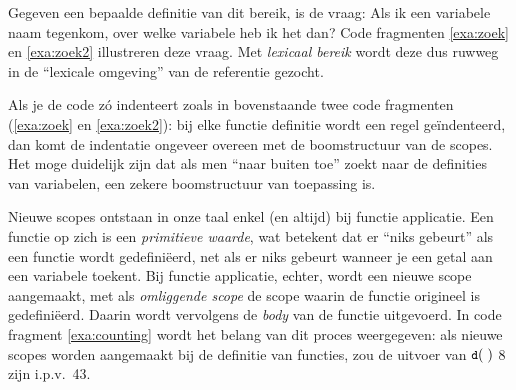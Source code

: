 Gegeven een bepaalde definitie van dit bereik, is de vraag: Als ik een variabele naam tegenkom, over welke variabele heb ik het dan? Code fragmenten \ref{exa:zoek} en \ref{exa:zoek2} illustreren deze vraag. Met \emph{lexicaal bereik} wordt deze dus ruwweg in de ``lexicale omgeving'' van de referentie gezocht.

\codeFragmentCaption
{}

\codeFragmentCaption
{}

Als je de code zó indenteert zoals in bovenstaande twee code fragmenten (\ref{exa:zoek} en \ref{exa:zoek2}): bij elke functie definitie wordt een regel geïndenteerd, dan komt de indentatie ongeveer overeen met de boomstructuur van de scopes. Het moge duidelijk zijn dat als men ``naar buiten toe'' zoekt naar de definities van variabelen, een zekere boomstructuur van toepassing is.

Nieuwe scopes ontstaan in onze taal enkel (en altijd) bij functie applicatie. Een functie op zich is een \emph{primitieve waarde}, wat betekent dat er ``niks gebeurt'' als een functie wordt gedefiniëerd, net als er niks gebeurt wanneer je een getal aan een variabele toekent. Bij functie applicatie, echter, wordt een nieuwe scope aangemaakt, met als \emph{omliggende scope} de scope waarin de functie origineel is gedefiniëerd. Daarin wordt vervolgens de \emph{body} van de functie uitgevoerd. In code fragment \ref{exa:counting} wordt het belang van dit proces weergegeven: als nieuwe scopes worden aangemaakt bij de definitie van functies, zou de uitvoer van $\text{\upshape\small\ttfamily d}(\;)$ 8 zijn i.p.v.~43.

\codeFragmentCaption
{}

